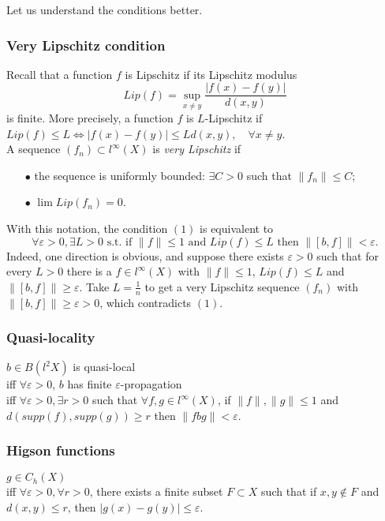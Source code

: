 Let us understand the conditions better.

\subsubsection*{Very Lipschitz condition} Recall that a function $f$ is Lipschitz if its Lipschitz modulus 
\[Lip(f) = \sup_{x\neq y} \frac{|f(x) - f(y)|}{d(x,y)}\]
is finite. More precisely, a function $f$ is $L$-Lipschitz if $Lip(f) \leq L \iff |f(x)-f(y)|\leq L d(x,y), \quad \forall x \neq y $.\\

A sequence $(f_n)\subset l^\infty (X)$ is \textit{very Lipschitz} if
\begin{itemize}
\item[$\bullet$] the sequence is uniformly bounded: $\exists C> 0 $ such that $\| f_n \| \leq C$;
\item[$\bullet$] $\lim Lip(f_n) = 0$.
\end{itemize} 
With this notation, the condition $(1)$ is equivalent to 
\[\forall \varepsilon > 0 , \exists L> 0 \text{ s.t. if } \|f \| \leq 1 \text{ and } Lip(f)\leq L \text{ then } \| [b,f] \| <\varepsilon. \]
Indeed, one direction is obvious, and suppose there exists $\varepsilon > 0 $ such that for every $L> 0$ there is a $f\in l^\infty (X)$ with $\| f\| \leq 1$, $Lip(f)\leq L $ and $\| [b, f ] \| \geq \varepsilon$. Take $L=\frac{1}{n}$ to get a very Lipschitz sequence $(f_n)$ with $\| [b,f]\| \geq \varepsilon > 0$, which contradicts $(1)$.\\

\subsubsection*{Quasi-locality} $b\in B(l^2X)$ is quasi-local \\
iff $\forall \varepsilon> 0$, $b$ has finite $\varepsilon$-propagation \\
iff $\forall \varepsilon > 0, \exists  r > 0$ such that $\forall f,g \in l^\infty (X)$, if $\|f\| , \|g\| \leq 1 $ and $d(supp(f), supp(g))\geq r$ then $\| fbg \| < \varepsilon$.

\subsubsection*{Higson functions} $g\in C_h(X)$ \\
iff $\forall \varepsilon > 0, \forall  r > 0$,  there exists a finite subset $F\subset X$ such that if $x,y \notin F$ and $d(x,y)\leq r$, then $|g(x)-g(y)|\leq \varepsilon$.

